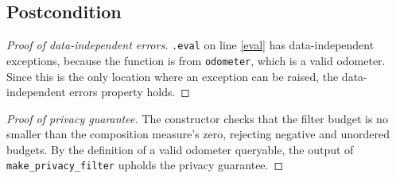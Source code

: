 \documentclass{article}
\begin{document}
\subsection*{Postcondition}
\begin{theorem}
\end{theorem}

\begin{proof}[Proof of data-independent errors]
    \texttt{.eval} on line \ref{eval} has data-independent exceptions,
    because the function is from \texttt{odometer}, which is a valid odometer.
    Since this is the only location where an exception can be raised,
    the data-independent errors property holds.
\end{proof}

\begin{proof}[Proof of privacy guarantee]
    The constructor checks that the filter budget is no smaller than the
    composition measure's zero, rejecting negative and unordered budgets.
    By the definition of a valid odometer queryable,
    the output of \texttt{make\_privacy\_filter} upholds the privacy guarantee.
\end{proof}
\end{document}
